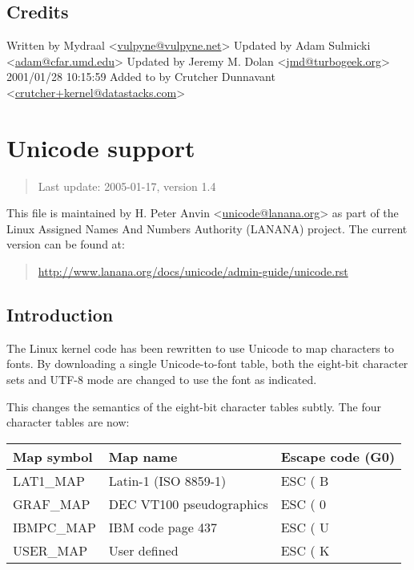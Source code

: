 \documentclass[a4paper,8pt,english]{sphinxmanual}
\begin{document}
\section{Credits}
\label{admin-guide/sysrq:credits}
Written by Mydraal \textless{}\href{mailto:vulpyne@vulpyne.net}{vulpyne@vulpyne.net}\textgreater{}
Updated by Adam Sulmicki \textless{}\href{mailto:adam@cfar.umd.edu}{adam@cfar.umd.edu}\textgreater{}
Updated by Jeremy M. Dolan \textless{}\href{mailto:jmd@turbogeek.org}{jmd@turbogeek.org}\textgreater{} 2001/01/28 10:15:59
Added to by Crutcher Dunnavant \textless{}\href{mailto:crutcher+kernel@datastacks.com}{crutcher+kernel@datastacks.com}\textgreater{}


\chapter{Unicode support}
\label{admin-guide/unicode:unicode-support}\label{admin-guide/unicode::doc}\begin{quote}

Last update: 2005-01-17, version 1.4
\end{quote}

This file is maintained by H. Peter Anvin \textless{}\href{mailto:unicode@lanana.org}{unicode@lanana.org}\textgreater{} as part
of the Linux Assigned Names And Numbers Authority (LANANA) project.
The current version can be found at:
\begin{quote}

\href{http://www.lanana.org/docs/unicode/admin-guide/unicode.rst}{http://www.lanana.org/docs/unicode/admin-guide/unicode.rst}
\end{quote}


\section{Introduction}
\label{admin-guide/unicode:introduction}
The Linux kernel code has been rewritten to use Unicode to map
characters to fonts.  By downloading a single Unicode-to-font table,
both the eight-bit character sets and UTF-8 mode are changed to use
the font as indicated.

This changes the semantics of the eight-bit character tables subtly.
The four character tables are now:

\begin{tabulary}{\linewidth}{|L|L|L|}
\hline
\textsf{\relax 
Map symbol
} & \textsf{\relax 
Map name
} & \textsf{\relax 
Escape code (G0)
}\\
\hline
LAT1\_MAP
 & 
Latin-1 (ISO 8859-1)
 & 
ESC ( B
\\
\hline
GRAF\_MAP
 & 
DEC VT100 pseudographics
 & 
ESC ( 0
\\
\hline
IBMPC\_MAP
 & 
IBM code page 437
 & 
ESC ( U
\\
\hline
USER\_MAP
 & 
User defined
 & 
ESC ( K
\\
\hline\end{tabulary}
\end{document}
